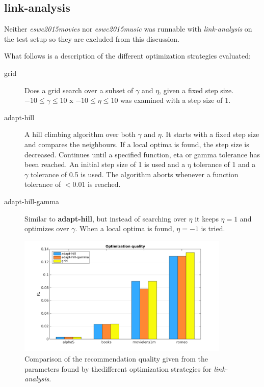 
\subsection{link-analysis}\label{sec:tuning:link}

Neither \textit{eswc2015movies} nor \textit{eswc2015music} was runnable with \textit{link-analysis} on the test setup so they are excluded from this discussion.

What follows is a description of the different optimization strategies evaluated:

\begin{description}
    \item[grid]
        Does a grid search over a subset of $\gamma$ and $\eta$, given a fixed step size. $-10 \leq \gamma \leq 10$ x $-10 \leq \eta \leq 10$ was examined with a step size of 1.
    \item[adapt-hill]
        A hill climbing algorithm over both $\gamma$ and $\eta$. It starts with a fixed step size and compares the neighbours. If a local optima is found, the step size is decreased. Continues until a specified function, eta or gamma tolerance has been reached. An initial step size of 1 is used and a $\eta$ tolerance of 1 and a $\gamma$ tolerance of 0.5 is used. The algorithm aborts whenever a function tolerance of $< 0.01$ is reached.
    \item[adapt-hill-gamma]
        Similar to \textbf{adapt-hill}, but instead of searching over $\eta$ it keeps $\eta = 1$ and optimizes over $\gamma$. When a local optima is found, $\eta = -1$ is tried.
\end{description}


\begin{figure}[h!]
    \centering
    \includegraphics[width=0.9\textwidth]{fig/comp/comp_link_quality.png}
    \caption{Comparison of the recommendation quality given from the parameters found by thedifferent optimization strategies for \textit{link-analysis}.}
\end{figure}

